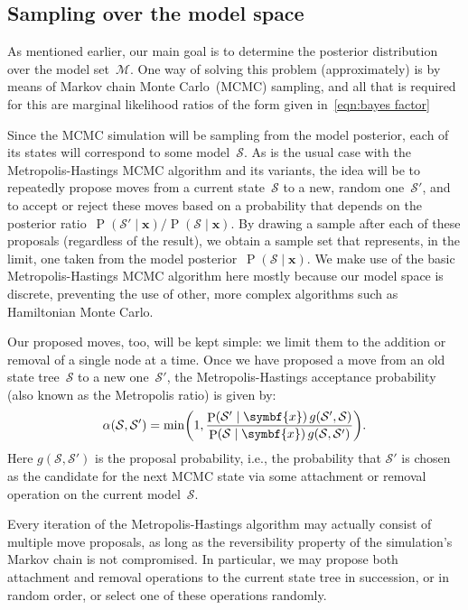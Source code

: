 \documentclass[12pt,a4paper]{article}
\newcommand\mc[1]{\mathcal{#1}}               %
\newcommand\ub[1]{\symbf{#1}}                 %
\DeclareMathOperator\Pb{P}                    %
\DeclarePairedDelimiter\lr{\lparen}{\rparen}  %
\begin{document}
\subsection{Sampling over the model space} %

As mentioned earlier, our main goal is to determine the posterior distribution
over the model set~\(\mc{M}\). One way of solving this problem (approximately)
is by means of Markov chain Monte Carlo~(MCMC) sampling, and all that is
required for this are marginal likelihood ratios of the form given
in~\eqref{eqn:bayes factor}

Since the MCMC simulation will be sampling from the model posterior, each of its
states will correspond to some model~\(\mc{S}\). As is the usual case with the
Metropolis-Hastings MCMC algorithm and its variants, the idea will be to
repeatedly propose moves from a current state~\(\mc{S}\) to a new, random
one~\(\mc{S}'\), and to accept or reject these moves based on a probability that
depends on the posterior ratio~\({\Pb(\mc{S}' \mid \ub{x})/\!\Pb(\mc{S} \mid
\ub{x})}\). By drawing a sample after each of these proposals (regardless of the
result), we obtain a sample set that represents, in the limit, one taken from
the model posterior~\(\Pb(\mc{S} \mid \ub{x})\). We make use of the basic
Metropolis-Hastings MCMC algorithm here mostly because our model space is
discrete, preventing the use of other, more complex algorithms such as
Hamiltonian Monte Carlo.

Our proposed moves, too, will be kept simple: we limit them to the addition or
removal of a single node at a time. Once we have proposed a move from an old
state tree~\(\mc{S}\) to a new one~\(\mc{S}'\), the Metropolis-Hastings
acceptance probability (also known as the Metropolis ratio) is given by:
\begin{equation*}
  \alpha\lr{\mc{S}, \mc{S}'} = \min\lr*{1, \frac{\Pb\lr{\mc{S}' \mid \ub{x}}\,
    g\lr{\mc{S}', \mc{S}}}{\Pb\lr{\mc{S} \mid \ub{x}}\, g\lr{\mc{S}, \mc{S}'}}}.
\end{equation*}
Here \(g(\mc{S}, \mc{S}')\) is the proposal probability, i.e., the probability
that \(\mc{S}'\) is chosen as the candidate for the next MCMC state via some
attachment or removal operation on the current model~\(\mc{S}\).

Every iteration of the Metropolis-Hastings algorithm may actually consist of
multiple move proposals, as long as the reversibility property of the
simulation's Markov chain is not compromised. In particular, we may propose both
attachment and removal operations to the current state tree in succession, or in
random order, or select one of these operations randomly.
\end{document}
